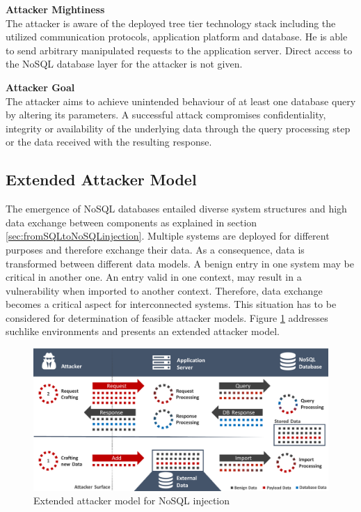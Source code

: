 \begin{minipage}[t]{0.48\textwidth}
  \textbf{Attacker Mightiness} \\ 
  The attacker is aware of the deployed tree tier technology stack including the utilized communication protocols, application platform and database. He is able to send arbitrary manipulated requests to the application server. Direct access to the NoSQL database layer for the attacker is not given.
\end{minipage}
\hfill
\begin{minipage}[t]{0.48\textwidth}
  \textbf{Attacker Goal} \\ 
  The attacker aims to achieve unintended behaviour of at least one database query by altering its parameters. A successful attack compromises confidentiality, integrity or availability of the underlying data through the query processing step or the data received with the resulting response.
\end{minipage}

\subsection{Extended Attacker Model}

The emergence of NoSQL databases entailed diverse system structures and high data exchange between components as explained in section \ref{sec:fromSQLtoNoSQLinjection}. Multiple systems are deployed for different purposes and therefore exchange their data. As a consequence, data is transformed between different data models. A benign entry in one system may be critical in another one. An entry valid in one context, may result in a vulnerability when imported to another context. Therefore, data exchange becomes a critical aspect for interconnected systems. This situation has to be considered for determination of feasible attacker models. Figure \ref{fig:extendedAttackerModel} addresses suchlike environments and presents an extended attacker model. \\

\begin{figure}[h]
\centering
  \includegraphics[width=1\linewidth]{Images/attacker_model_extended}
  \caption{Extended attacker model for NoSQL injection}
  \label{fig:extendedAttackerModel}
\end{figure}

